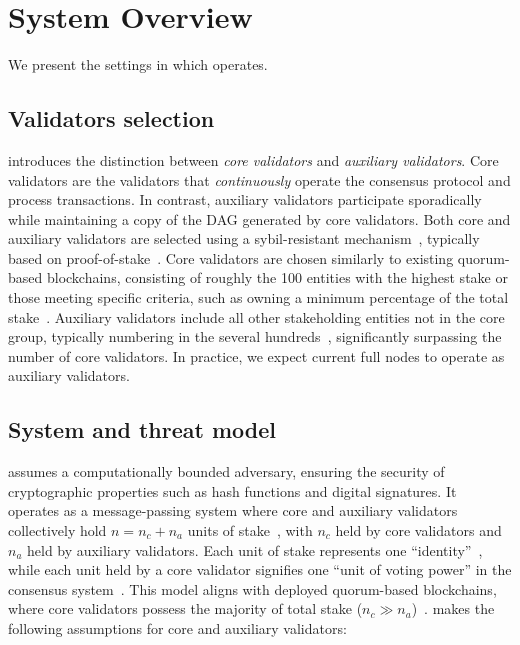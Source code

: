 \section{System Overview} \label{sec:overview}

We present the settings in which \sysname operates.

\subsection{Validators selection} \label{sec:validators}
\sysname introduces the distinction between \emph{core validators} and \emph{auxiliary validators}. Core validators are the validators that \emph{continuously} operate the consensus protocol and process transactions. In contrast, auxiliary validators participate sporadically while maintaining a copy of the DAG generated by core validators.
Both core and auxiliary validators are selected using a sybil-resistant mechanism~\cite{douceur2002sybil}, typically based on proof-of-stake~\cite{kucci2021proof}. Core validators are chosen similarly to existing quorum-based blockchains, consisting of roughly the 100 entities with the highest stake or those meeting specific criteria, such as owning a minimum percentage of the total stake~\cite{sui}.  Auxiliary validators include all other stakeholding entities not in the core group, typically numbering in the several hundreds~\cite{sui-scan}, significantly surpassing the number of core validators.  In practice, we expect current full nodes to operate as auxiliary validators.

\subsection{System and threat model} \label{sec:model}
\sysname assumes a computationally bounded adversary, ensuring the security of cryptographic properties such as hash functions and digital signatures. It operates as a message-passing system where core and auxiliary validators collectively hold  $n = n_c + n_a$ units of stake~\cite{saad2020comparative}, with $n_c$ held by core validators and $n_a$ held by auxiliary validators. Each unit of stake represents one ``identity''~\cite{douceur2002sybil}, while each unit held by a core validator signifies one ``unit of voting power'' in the consensus system~\cite{sui-code,sui}. This model aligns with deployed quorum-based blockchains, where core validators possess the majority of total stake ($n_c \gg n_a$)~\cite{sui,aptos,solana}. \sysname makes the following assumptions for core and auxiliary validators:

